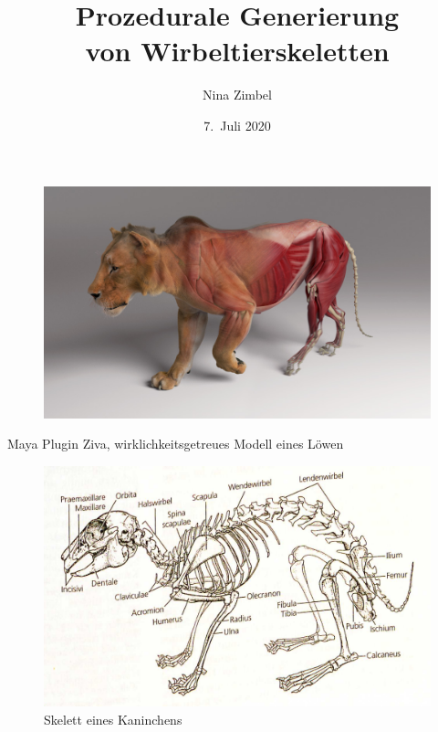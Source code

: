 \documentclass{beamer}
\title{Prozedurale Generierung\\ von Wirbeltierskeletten}
\author{Nina Zimbel}
\institute{KIT -- Institut für Visualisierung und Datenanalyse}
\date{7.\ Juli 2020}
\begin{document}
\begin{frame}
 \maketitle
\end{frame}

\begin{frame}[plain]
 \centering
 \begin{figure}
  \includegraphics[width=\textwidth]{graphics/ziva-post2.jpg}
 \end{figure}
 \small Maya Plugin Ziva, wirklichkeitsgetreues Modell eines Löwen \cite{Ziva_Lion}
\end{frame}

\begin{frame}[plain]
 \begin{figure}
  \centering
  \includegraphics[width=\textwidth]{graphics/kaninchen.jpg}
  \caption{Skelett eines Kaninchens \cite{Spezielle_Zoologie}}
 \end{figure}
\end{frame}
\end{document}

